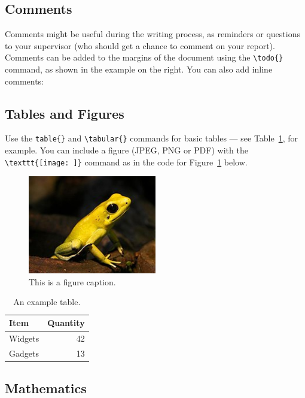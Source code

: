 \documentclass[12pt]{article}
\begin{document}
\subsection{Comments}

Comments might be useful during the writing process, as reminders or questions to your supervisor (who should get a chance to comment on your report). Comments can be added to the margins of the document using the  \verb$\todo{}$ command, as shown in the example on the right. You can also add inline comments:


\subsection{Tables and Figures}

Use the \verb$table{}$ and \verb$\tabular{}$ commands for basic tables --- see Table~\ref{tab:widgets}, for example. You can include a figure (JPEG, PNG or PDF) with the \verb$\texttt{[image: ]}$ command as in the code for Figure~\ref{fig:frog} below.

\begin{figure}
\centering
\includegraphics[width=0.5\textwidth]{figures/frog.jpg}
\caption{\label{fig:frog}This is a figure caption.}
\end{figure}

\begin{table}
\centering
\begin{tabular}{l|r}
Item & Quantity \\\hline
Widgets & 42 \\
Gadgets & 13
\end{tabular}
\caption{\label{tab:widgets}An example table.}
\end{table}

\subsection{Mathematics}
\end{document}
